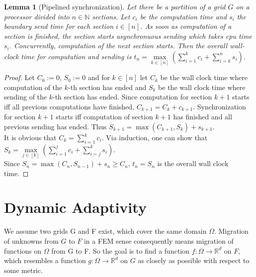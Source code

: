 \documentclass{IOS-Book-Article}
\theoremstyle{plain}
\newtheorem{lemma}[theorem]{Lemma}
\theoremstyle{definition}
\begin{document}
\begin{lemma}[Pipelined synchronization]
	Let there be a partition of a grid $G$ on a processor divided into $n \in \mathbb N$ sections. Let $c_i$ be the computation time and $s_i$ the boundary send time for each section $i \in [n]$. As soon as computation of a section is finished, the section starts asynchronuous sending which takes cpu time $s_i$. Concurrently, computation of the next section starts. Then the overall wall-clock time for computation and sending is $t_n = \max \limits_{k \in [n]} \left( \sum \limits_{i = 1}^{k} c_i + \sum \limits_{i = k}^{n} s_i \right)$.
\end{lemma}

\begin{proof}
	Let $C_0 := 0$, $S_0 := 0$ and for $k \in [n]$ let $C_k$ be the wall clock time where computation of the $k$-th section has ended and $S_k$ be the wall clock time where sending of the $k$-th section has ended. Since computation for section $k + 1$ starts iff all previous computations have finished, $C_{k + 1} = C_k + c_{k + 1}$. Synchronization for section $k + 1$ starts iff computation of section $k + 1$ has finished and all previous sending has ended. Thus $S_{k + 1} = \max(C_{k + 1}, S_k) + s_{k + 1}$.\\
	It is obvious that $C_k = \sum \limits_{i = 1}^{k} c_i$. Via induction, one can show that $S_k = \max \limits_{j \in [k]} \left( \sum \limits_{i = 1}^{j} c_i + \sum \limits_{i = j}^{k} s_i \right)$.\\
	Since $S_n = \max(C_n, S_{n - 1}) + s_n \geq C_n$, $t_n = S_n$ is the overall wall clock time.
\end{proof}


\newpage
\section{Dynamic Adaptivity}

We assume two grids G and F exist, which cover the same domain $\Omega$. Migration of unknowns from $G$ to $F$ in a FEM sense consequently means migration of functions on $\Omega$ from G to F. So the goal is to find a function $f: \Omega \rightarrow \mathbb{R}^d$ on $F$, which resembles a function $g: \Omega \rightarrow \mathbb{R}^d$ on $G$ as closely as possible with respect to some metric.\\
\end{document}

